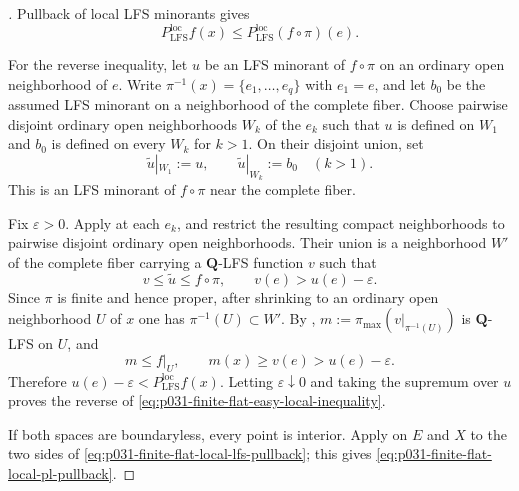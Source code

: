 \begin{proof}[]
Pullback of local LFS minorants gives
\begin{equation}
\label{eq:p031-finite-flat-easy-local-inequality}
 P_{\mathrm{LFS}}^{\mathrm{loc}}f(x)
   \leq P_{\mathrm{LFS}}^{\mathrm{loc}}(f\circ\pi)(e).
\end{equation}

For the reverse inequality, let $u$ be an LFS minorant of $f\circ\pi$ on
an ordinary open neighborhood of $e$.  Write
$\pi^{-1}(x)=\{e_1,\ldots,e_q\}$ with $e_1=e$, and let $b_0$ be the
assumed LFS minorant on a neighborhood of the complete fiber.  Choose
pairwise disjoint ordinary open neighborhoods $W_k$ of the $e_k$ such that
$u$ is defined on $W_1$ and $b_0$ is defined on every $W_k$ for $k>1$.
On their disjoint union, set
\[
 \widetilde u|_{W_1}:=u,
 \qquad
 \widetilde u|_{W_k}:=b_0\quad(k>1).
\]
This is an LFS minorant of $f\circ\pi$ near the complete fiber.

Fix $\varepsilon>0$.  Apply
 at each $e_k$, and restrict
the resulting compact neighborhoods to pairwise disjoint ordinary open
neighborhoods.  Their union is a neighborhood $W'$ of the complete fiber
carrying a $\mathbf Q$-LFS function $v$ such that
\begin{equation}
\label{eq:p031-complete-fiber-rational-minorant}
             v\leq\widetilde u\leq f\circ\pi,
             \qquad v(e)>u(e)-\varepsilon.
\end{equation}
Since $\pi$ is finite and hence proper, after shrinking to an ordinary open
neighborhood $U$ of $x$ one has $\pi^{-1}(U)\subset W'$.  By
,
$m:=\pi_{\max}(v|_{\pi^{-1}(U)})$ is $\mathbf Q$-LFS on $U$, and
\[
                         m\leq f|_U,
             \qquad m(x)\geq v(e)>u(e)-\varepsilon.
\]
Therefore $u(e)-\varepsilon<P_{\mathrm{LFS}}^{\mathrm{loc}}f(x)$.
Letting $\varepsilon\downarrow0$ and taking the supremum over $u$ proves
the reverse of \eqref{eq:p031-finite-flat-easy-local-inequality}.

If both spaces are boundaryless, every point is interior.  Apply
 on $E$ and $X$ to the two sides of
\eqref{eq:p031-finite-flat-local-lfs-pullback}; this gives
\eqref{eq:p031-finite-flat-local-pl-pullback}.
\end{proof}

